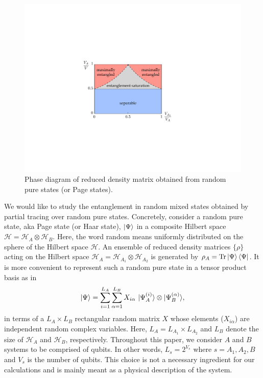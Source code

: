 \documentclass[aps,pra,groupedaddress,onecolumn,notitlepage,superscriptaddress,10pt]{revtex4-1}
\newcommand{\Hi}{\mathcal{H}}
\newcommand{\Tr}{\text{Tr}}
\begin{document}
\begin{figure}
\includegraphics[scale=0.6]{images/phase_diag.pdf}
\caption{\label{fig:phasediag} Phase diagram of reduced density matrix obtained from random pure states (or Page states).}
\end{figure}


We would like to study the entanglement in random mixed states obtained by partial tracing over random pure states.  Concretely, consider a random pure state, aka Page state (or Haar state),  $\ket{\Psi}$ in a composite Hilbert space $\Hi= \Hi_{A}\otimes \Hi_{B}$. Here, the word random means uniformly distributed on the sphere of the Hilbert space $\Hi$.
An ensemble of reduced density matrices $\{ \rho \}$ acting on the Hilbert space $\Hi_A=\Hi_{A_1}\otimes \Hi_{A_2}$ is generated by  $\rho_A=\Tr\ket{\Psi}\bra{\Psi}$.
It is more convenient to represent such a random pure state in
a tensor product basis as in
\begin{align}
\label{eq:page_tri}
\ket{\Psi}=\sum_{i=1}^{L_A} \sum_{\alpha=1}^{L_B} X_{i\alpha} \ |\Psi^{(i)}_{A} \rangle\otimes|\Psi^{(\alpha)}_B\rangle,
\end{align}
in terms of a $L_A \times L_B$ rectangular random matrix $X$
whose elements ($X_{i \alpha}$) are independent random complex variables. Here, $L_{A}=L_{A_1}\times L_{A_2}$ and $L_B$ denote the size of $\Hi_A$ and $\Hi_B$, respectively. Throughout this paper, we consider $A$ and $B$ systems to be comprised of qubits. In other words,  $L_s=2^{V_s}$ where $s=A_1,A_2,B$ and $V_s$ is the number of qubits. This choice is not a necessary ingredient for our calculations and is mainly meant as a physical description of the system.
\end{document}
